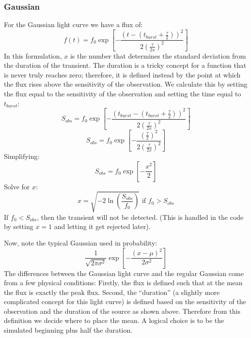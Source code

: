 \documentclass{article}
\begin{document}
\subsubsection{Gaussian}
For the Gaussian light curve we have a flux of:
\[f(t) = f_0  \exp[-\frac{(t-(t_{burst}+\frac{\tau}{2}))^2}{2(\frac{\tau}{2x})^2}]\]
In this formulation, $x$ is the number that determines the standard deviation from the duration of the transient. The duration is a tricky concept for a function that is never truly reaches zero; therefore, it is defined instead by the point at which the flux rises above the sensitivity of the observation. We calculate this by setting the flux equal to the sensitivity of the observation and setting the time equal to $t_{burst}$:
\[S_{obs} = f_0 \exp[-\frac{(t_{burst}-(t_{burst}+\frac{\tau}{2}))^2}{2(\frac{\tau}{2x})^2}]\]
\[S_{obs} = f_0 \exp[-\frac{(\frac{\tau}{2})^2}{2(\frac{\tau}{2x})^2}]\]
Simplifying:
\[S_{obs} = f_0 \exp[-\frac{x^2}{2}]\]
Solve for $x$:
\[x=\sqrt{-2\ln(\frac{S_{obs}}{f_0})}\text{ if }f_0>S_{obs}\]
If $f_0<S_{obs}$, then the transient will not be detected. (This is handled in the code by setting $x=1$ and letting it get rejected later).

Now, note the typical Gaussian used in probability:
\[ \frac{1}{\sqrt{2\pi\sigma^2}}\exp[-\frac{(x-\mu)^2}{2\sigma^2}]\]
The differences between the Gaussian light curve and the regular Gaussian come from a few physical conditions: Firstly, the flux is defined such that at the mean the flux is exactly the peak flux. Second, the ``duration'' (a slightly more complicated concept for this light curve) is defined based on the sensitivity of the observation and the duration of the source as shown above. Therefore from this definition we decide where to place the mean. A logical choice is to be the simulated beginning plus half the duration. 
\end{document}
